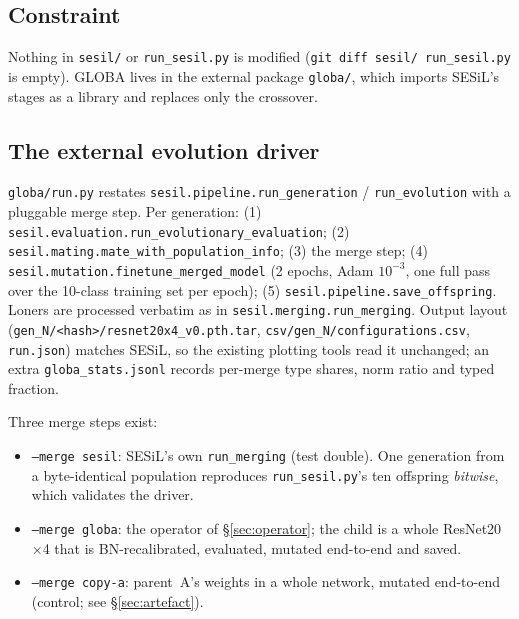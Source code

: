 \documentclass[11pt,a4paper]{article}
\newcommand{\code}[1]{\texttt{#1}}
\begin{document}
\subsection{Constraint}
Nothing in \code{sesil/} or \code{run\_sesil.py} is modified (\code{git diff sesil/ run\_sesil.py} is empty). GLOBA lives in the external package \code{globa/}, which imports SESiL's stages as a library and replaces only the crossover.

\subsection{The external evolution driver}
\code{globa/run.py} restates \code{sesil.pipeline.run\_generation} / \code{run\_evolution} with a pluggable merge step. Per generation: (1) \code{sesil.evaluation.run\_evolutionary\_evaluation}; (2) \code{sesil.mating.mate\_with\_population\_info}; (3) the merge step; (4) \code{sesil.mutation.finetune\_merged\_model} (2 epochs, Adam $10^{-3}$, one full pass over the 10-class training set per epoch); (5) \code{sesil.pipeline.save\_offspring}. Loners are processed verbatim as in \code{sesil.merging.run\_merging}. Output layout (\code{gen\_N/<hash>/resnet20x4\_v0.pth.tar}, \code{csv/gen\_N/configurations.csv}, \code{run.json}) matches SESiL, so the existing plotting tools read it unchanged; an extra \code{globa\_stats.jsonl} records per-merge type shares, norm ratio and typed fraction.

Three merge steps exist:
\begin{itemize}[nosep]
\item \code{--merge sesil}: SESiL's own \code{run\_merging} (test double). One generation from a byte-identical population reproduces \code{run\_sesil.py}'s ten offspring \emph{bitwise}, which validates the driver.
\item \code{--merge globa}: the operator of \S\ref{sec:operator}; the child is a whole ResNet20$\times$4 that is BN-recalibrated, evaluated, mutated end-to-end and saved.
\item \code{--merge copy-a}: parent~A's weights in a whole network, mutated end-to-end (control; see \S\ref{sec:artefact}).
\end{itemize}
\end{document}
